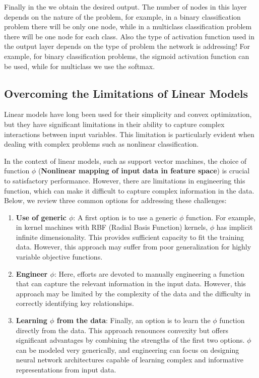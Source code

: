 Finally in the \textbf{\color{red!80!black}{Output Layer}} we obtain the desired output.
The number of nodes in this layer depends on the nature of the problem, for example, in a binary classification problem there will be only one node, while in a multiclass classification problem there will be one node for each class.
Also the type of activation function used in the output layer depends on the type of problem the network is addressing! For example, for binary classification problems, the sigmoid activation function can be used, while for multiclass we use the softmax.

\subsection{Overcoming the Limitations of Linear Models}

Linear models have long been used for their simplicity and convex optimization, but they have significant limitations in their ability to capture complex interactions between input variables. This limitation is particularly evident when dealing with complex problems such as nonlinear classification.

In the context of linear models, such as support vector machines, the choice of function \( \phi \) (\textbf{Nonlinear mapping of input data in feature space}) is crucial to satisfactory performance. However, there are limitations in engineering this function, which can make it difficult to capture complex information in the data. Below, we review three common options for addressing these challenges:
\begin{enumerate}
    \item \textbf{Use of generic \( \phi \)}: A first option is to use a generic \( \phi \) function. For example, in kernel machines with RBF (Radial Basis Function) kernels, \( \phi \) has implicit infinite dimensionality. This provides sufficient capacity to fit the training data. However, this approach may suffer from poor generalization for highly variable objective functions.
    \item \textbf{Engineer \( \phi \)}: Here, efforts are devoted to manually engineering a function that can capture the relevant information in the input data. However, this approach may be limited by the complexity of the data and the difficulty in correctly identifying key relationships.
    \item \textbf{Learning \( \phi \) from the data}: Finally, an option is to learn the \( \phi \) function directly from the data. This approach renounces convexity but offers significant advantages by combining the strengths of the first two options. \( \phi \) can be modeled very generically, and engineering can focus on designing neural network architectures capable of learning complex and informative representations from input data.
\end{enumerate}


